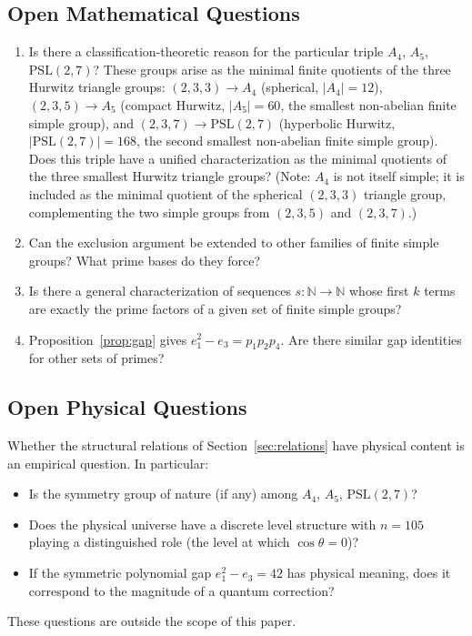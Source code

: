﻿\documentclass[11pt]{article}
\begin{document}
\subsection{Open Mathematical Questions}
\begin{enumerate}
\item Is there a classification-theoretic reason for the
  particular triple $A_4$, $A_5$, $\mathrm{PSL}(2,7)$?
  These groups arise as the minimal finite quotients of the
  three Hurwitz triangle groups:
  $(2,3,3) \to A_4$ (spherical, $|A_4| = 12$),
  $(2,3,5) \to A_5$ (compact Hurwitz, $|A_5| = 60$,
  the smallest non-abelian finite simple group), and
  $(2,3,7) \to \mathrm{PSL}(2,7)$ (hyperbolic Hurwitz,
  $|\mathrm{PSL}(2,7)| = 168$, the second smallest
  non-abelian finite simple group). Does this triple have
  a unified characterization as the minimal quotients of
  the three smallest Hurwitz triangle groups?
  (Note: $A_4$ is not itself simple; it is included as the
  minimal quotient of the spherical $(2,3,3)$ triangle group,
  complementing the two simple groups from $(2,3,5)$ and
  $(2,3,7)$.)
\item Can the exclusion argument be extended to other
  families of finite simple groups? What prime bases do
  they force?
\item Is there a general characterization of sequences
  $s : \mathbb{N} \to \mathbb{N}$ whose first $k$ terms
  are exactly the prime factors of a given set of finite
  simple groups?
\item Proposition~\ref{prop:gap} gives
  $e_1^2 - e_3 = p_1 p_2 p_4$. Are there similar gap
  identities for other sets of primes?
\end{enumerate}

\subsection{Open Physical Questions}
Whether the structural relations of
Section~\ref{sec:relations} have physical content is an
empirical question. In particular:
\begin{itemize}
\item Is the symmetry group of nature (if any) among
  $A_4$, $A_5$, $\mathrm{PSL}(2,7)$?
\item Does the physical universe have a discrete level
  structure with $n = 105$ playing a distinguished role
  (the level at which $\cos\theta = 0$)?
\item If the symmetric polynomial gap
  $e_1^2 - e_3 = 42$ has physical meaning, does it
  correspond to the magnitude of a quantum correction?
\end{itemize}
These questions are outside the scope of this paper.
\end{document}
